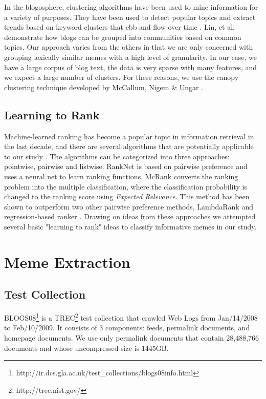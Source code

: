 \documentclass{sig-alternate}
\begin{document}
In the blogosphere, clustering algorithms have been used to mine information for a variety of purposes. They have been used to detect popular topics and extract trends based on keyword clusters that ebb and flow over time \cite{Qamra2006,Bansal}. Lin, et al. \cite{Lin2007} demonstrate how blogs can be grouped into communities based on common topics. Our approach varies from the others in that we are only concerned with grouping lexically similar memes with a high level of granularity. In our case, we have a large corpus of blog text, the data is very sparse with many features, and we expect a large number of clusters. For these reasons, we use the canopy clustering technique developed by McCallum, Nigem \& Ungar \cite{McCallum2000}.

\subsection{Learning to Rank}
Machine-learned ranking has become a popular topic in information retrieval in the last decade, and there are several algorithms that are potentially applicable to our study \cite{Liu2011}. The algorithms can be categorized into three approaches: pointwise, pairwise and listwise. RankNet \cite{Burges2005} is based on pairwise preference and uses a neural net to learn ranking functions. McRank \cite{Li2007} converts the ranking problem into the multiple classification, where the classification probability is changed to the ranking score using \emph{Expected Relevance}. This method has been shown to outperform two other pairwise preference methods, LambdaRank \cite{Burges2007} and regression-based ranker \cite{springerlink:10.1007/11776420_44}. Drawing on ideas from these approaches we attempted several basic "learning to rank" ideas to classify informative memes in our study.

\section{Meme Extraction}

\subsection{Test Collection}

BLOGS08\footnote{http://ir.dcs.gla.ac.uk/test\_collections/blogs08info.html} is a TREC\footnote{http://trec.nist.gov/} test collection that crawled Web Logs from Jan/14/2008 to Feb/10/2009. It consists of 3 components: feeds, permalink documents, and homepage documents. We use only permalink documents that contain 28,488,766 documents and whose uncompressed size is 1445GB. 
\end{document}
